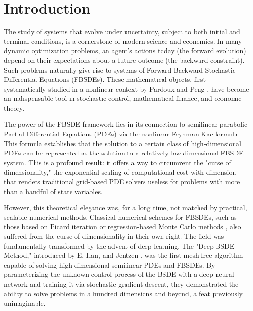 \vspace{1em}

{\hypersetup{linkcolor=distillDarkGray}
\tableofcontents
}

\newpage


\section{Introduction}
\label{sec:introduction}

The study of systems that evolve under uncertainty, subject to both initial and terminal conditions, is a cornerstone of modern science and economics. In many dynamic optimization problems, an agent's actions today (the forward evolution) depend on their expectations about a future outcome (the backward constraint). Such problems naturally give rise to systems of Forward-Backward Stochastic Differential Equations (FBSDEs). These mathematical objects, first systematically studied in a nonlinear context by Pardoux and Peng \cite{PardouxPeng1990}, have become an indispensable tool in stochastic control, mathematical finance, and economic theory.

The power of the FBSDE framework lies in its connection to semilinear parabolic Partial Differential Equations (PDEs) via the nonlinear Feynman-Kac formula \cite{PardouxPeng1992}. This formula establishes that the solution to a certain class of high-dimensional PDEs can be represented as the solution to a relatively low-dimensional FBSDE system. This is a profound result: it offers a way to circumvent the "curse of dimensionality," the exponential scaling of computational cost with dimension that renders traditional grid-based PDE solvers useless for problems with more than a handful of state variables.

However, this theoretical elegance was, for a long time, not matched by practical, scalable numerical methods. Classical numerical schemes for FBSDEs, such as those based on Picard iteration or regression-based Monte Carlo methods \cite{Gobet2005, BenderSteiner2012}, also suffered from the curse of dimensionality in their own right. The field was fundamentally transformed by the advent of deep learning. The "Deep BSDE Method," introduced by E, Han, and Jentzen \cite{EHanJentzen2017}, was the first mesh-free algorithm capable of solving high-dimensional semilinear PDEs and FBSDEs. By parameterizing the unknown control process of the BSDE with a deep neural network and training it via stochastic gradient descent, they demonstrated the ability to solve problems in a hundred dimensions and beyond, a feat previously unimaginable.

